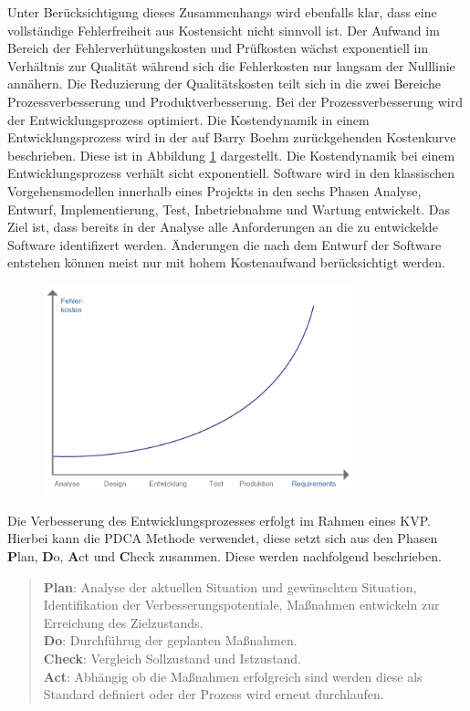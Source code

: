 Unter Berücksichtigung dieses Zusammenhangs wird ebenfalls klar, dass eine vollständige Fehlerfreiheit aus Kostensicht nicht sinnvoll ist.
Der Aufwand im Bereich der Fehlerverhütungskosten und Prüfkosten wächst exponentiell im Verhältnis zur Qualität während sich die Fehlerkosten nur langsam der Nulllinie annähern.
\newparagraph
Die Reduzierung der Qualitätskosten teilt sich in die zwei Bereiche Prozessverbesserung und Produktverbesserung.
Bei der Prozessverbesserung wird der Entwicklungsprozess optimiert.
Die Kostendynamik in einem Entwicklungsprozess wird in der auf Barry Boehm zurückgehenden Kostenkurve beschrieben.
Diese ist in Abbildung \ref{fig:boehm} dargestellt.
Die Kostendynamik bei einem Entwicklungsprozess verhält sicht exponentiell.
Software wird in den klassischen Vorgehensmodellen innerhalb eines Projekts in den sechs Phasen Analyse, Entwurf, Implementierung, Test, Inbetriebnahme und Wartung entwickelt.
Das Ziel ist, dass bereits in der Analyse alle Anforderungen an die zu entwickelde Software identifizert werden.
Änderungen die nach dem Entwurf der Software entstehen können meist nur mit hohem Kostenaufwand berücksichtigt werden.
\autocite[vgl.][S. 95]{witte_testmanagement_2019}
\begin{figure}[H]
    \centering
    \includegraphics[width=0.8\textwidth]{images/boehm.png}
    \label{fig:boehm}
\end{figure}\noindent
Die Verbesserung des Entwicklungsprozesses erfolgt im Rahmen eines \ac{KVP}.
Hierbei kann die PDCA Methode verwendet, diese setzt sich aus den Phasen \textbf{P}lan, \textbf{D}o, \textbf{A}ct und \textbf{C}heck zusammen.
Diese werden nachfolgend beschrieben.
\begin{quote}
    \textbf{Plan}: Analyse der aktuellen Situation und gewünschten Situation, Identifikation der Verbesserungspotentiale, Maßnahmen entwickeln zur Erreichung des Zielzustands.\\
    \textbf{Do}: Durchführug der geplanten Maßnahmen.\\
    \textbf{Check}: Vergleich Sollzustand und Istzustand.\\
    \textbf{Act}: Abhängig ob die Maßnahmen erfolgreich sind werden diese als Standard definiert oder der Prozess wird erneut durchlaufen.
\end{quote}
